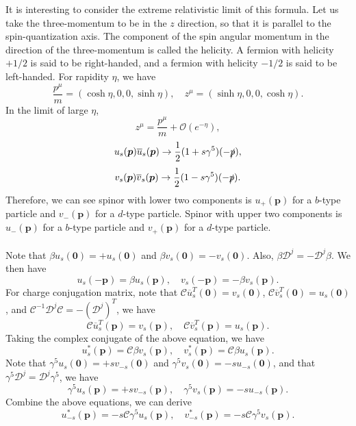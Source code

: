 \noindent
It is interesting to consider the extreme relativistic limit of this formula. Let us take the three-momentum to be in the $z$ direction, so that it is parallel to the spin-quantization axis. The component of the spin angular momentum in the direction of the three-momentum is called the helicity. A fermion with helicity $+1/2$ is said to be right-handed, and a fermion with helicity $-1/2$ is said to be left-handed.
For rapidity $\eta$, we have
\[\frac{p^{\mu}}{m} = (\cosh \eta, 0, 0, \sinh \eta) , \quad z^{\mu} = (\sinh \eta, 0, 0, \cosh \eta).\]
In the limit of large $\eta$,
\[z^{\mu} = \frac{p^{\mu}}{m} + \mathcal{O}(e^{-\eta}),\]
\[u_s(\bm{p}) \overline{u}_s(\bm{p})  \to \frac{1}{2}(1+s\gamma^5)(-\slashed{p}),\]
\[v_s(\bm{p}) \overline{v}_s(\bm{p})  \to \frac{1}{2}(1-s\gamma^5)(-\slashed{p}).\]
Therefore, we can see spinor with lower two components is $u_+(\bm{p})$ for a $b$-type particle and $v_-({\bm{p}})$ for a $d$-type particle.
Spinor with upper two components is $u_-(\bm{p})$ for a $b$-type particle and $v_+(\bm{p})$ for a $d$-type particle.
\\ \\
Note that $\beta u_s(\bm{0}) = + u_s(\bm{0})$ and $\beta v_s(\bm{0}) = -v_s(\bm{0})$. Also, $\beta \mathcal{D}^j = - \mathcal{D}^j \beta$. We then have
\[u_s(-\bm{p}) = \beta u_s(\bm{p}) , \quad v_s(-\bm{p}) = -\beta v_s(\bm{p}).\]
For charge conjugation matrix, note that $\mathcal{C} \overline{u}^T_s(\bm{0}) = v_s(\bm{0})$, $\mathcal{C} \overline{v}^T_s(\bm{0}) = u_s(\bm{0})$, and $\mathcal{C}^{-1} \mathcal{D}^j \mathcal{C} = - (\mathcal{D}^j)^T$, we have
\[\mathcal{C} \overline{u}^T_s(\bm{p}) = v_s(\bm{p}) , \quad \mathcal{C} \overline{v}^T_s(\bm{p}) = u_s(\bm{p}).\]
Taking the complex conjugate of the above equation, we have
\[u^*_s(\bm{p}) = \mathcal{C}\beta v_s(\bm{p}) , \quad v^*_s(\bm{p}) = \mathcal{C}\beta u_s(\bm{p}).\]
Note that $\gamma^5 u_{s}(\bm{0}) = +s v_{-s}(\bm{0})$ and $\gamma^5 v_{s}(\bm{0}) = -s u_{-s}(\bm{0})$, and that $\gamma^5 \mathcal{D}^j = \mathcal{D}^j \gamma^5$, we have
\[\gamma^5 u_{s}(\bm{p}) = +s v_{-s}(\bm{p}) , \quad \gamma^5 v_{s}(\bm{p}) = -s u_{-s}(\bm{p}).\]
Combine the above equations, we can derive
\[u^*_{-s}(\bm{p}) = -s\mathcal{C}\gamma^5 u_s(\bm{p}) , \quad v^*_{-s}(\bm{p}) = -s\mathcal{C}\gamma^5 v_s(\bm{p}).\]

